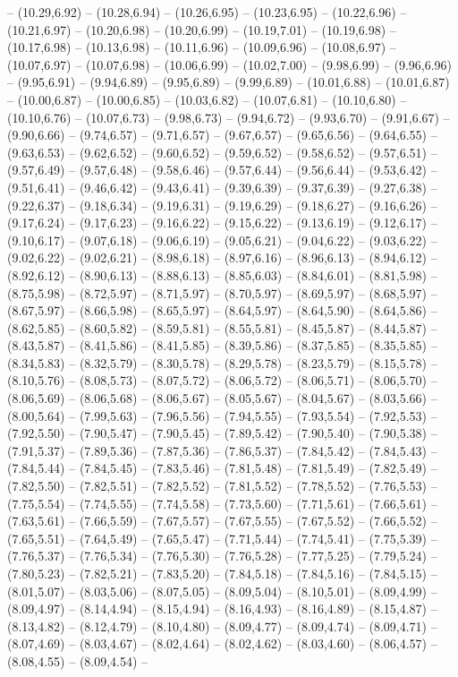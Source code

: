 {-- (10.29,6.92) -- (10.28,6.94) -- (10.26,6.95) -- (10.23,6.95) -- (10.22,6.96) -- (10.21,6.97) -- (10.20,6.98) -- (10.20,6.99) -- (10.19,7.01) -- (10.19,6.98) -- (10.17,6.98) -- (10.13,6.98) -- (10.11,6.96) -- (10.09,6.96) -- (10.08,6.97) -- (10.07,6.97) -- (10.07,6.98) -- (10.06,6.99) -- (10.02,7.00) -- (9.98,6.99) -- (9.96,6.96) -- (9.95,6.91) -- (9.94,6.89) -- (9.95,6.89) -- (9.99,6.89) -- (10.01,6.88) -- (10.01,6.87) -- (10.00,6.87) -- (10.00,6.85) -- (10.03,6.82) -- (10.07,6.81) -- (10.10,6.80) -- (10.10,6.76) -- (10.07,6.73) -- (9.98,6.73) -- (9.94,6.72) -- (9.93,6.70) -- (9.91,6.67) -- (9.90,6.66) -- (9.74,6.57) -- (9.71,6.57) -- (9.67,6.57) -- (9.65,6.56) -- (9.64,6.55) -- (9.63,6.53) -- (9.62,6.52) -- (9.60,6.52) -- (9.59,6.52) -- (9.58,6.52) -- (9.57,6.51) -- (9.57,6.49) -- (9.57,6.48) -- (9.58,6.46) -- (9.57,6.44) -- (9.56,6.44) -- (9.53,6.42) -- (9.51,6.41) -- (9.46,6.42) -- (9.43,6.41) -- (9.39,6.39) -- (9.37,6.39) -- (9.27,6.38) -- (9.22,6.37) -- (9.18,6.34) -- (9.19,6.31) -- (9.19,6.29) -- (9.18,6.27) -- (9.16,6.26) -- (9.17,6.24) -- (9.17,6.23) -- (9.16,6.22) -- (9.15,6.22) -- (9.13,6.19) -- (9.12,6.17) -- (9.10,6.17) -- (9.07,6.18) -- (9.06,6.19) -- (9.05,6.21) -- (9.04,6.22) -- (9.03,6.22) -- (9.02,6.22) -- (9.02,6.21) -- (8.98,6.18) -- (8.97,6.16) -- (8.96,6.13) -- (8.94,6.12) -- (8.92,6.12) -- (8.90,6.13) -- (8.88,6.13) -- (8.85,6.03) -- (8.84,6.01) -- (8.81,5.98) -- (8.75,5.98) -- (8.72,5.97) -- (8.71,5.97) -- (8.70,5.97) -- (8.69,5.97) -- (8.68,5.97) -- (8.67,5.97) -- (8.66,5.98) -- (8.65,5.97) -- (8.64,5.97) -- (8.64,5.90) -- (8.64,5.86) -- (8.62,5.85) -- (8.60,5.82) -- (8.59,5.81) -- (8.55,5.81) -- (8.45,5.87) -- (8.44,5.87) -- (8.43,5.87) -- (8.41,5.86) -- (8.41,5.85) -- (8.39,5.86) -- (8.37,5.85) -- (8.35,5.85) -- (8.34,5.83) -- (8.32,5.79) -- (8.30,5.78) -- (8.29,5.78) -- (8.23,5.79) -- (8.15,5.78) -- (8.10,5.76) -- (8.08,5.73) -- (8.07,5.72) -- (8.06,5.72) -- (8.06,5.71) -- (8.06,5.70) -- (8.06,5.69) -- (8.06,5.68) -- (8.06,5.67) -- (8.05,5.67) -- (8.04,5.67) -- (8.03,5.66) -- (8.00,5.64) -- (7.99,5.63) -- (7.96,5.56) -- (7.94,5.55) -- (7.93,5.54) -- (7.92,5.53) -- (7.92,5.50) -- (7.90,5.47) -- (7.90,5.45) -- (7.89,5.42) -- (7.90,5.40) -- (7.90,5.38) -- (7.91,5.37) -- (7.89,5.36) -- (7.87,5.36) -- (7.86,5.37) -- (7.84,5.42) -- (7.84,5.43) -- (7.84,5.44) -- (7.84,5.45) -- (7.83,5.46) -- (7.81,5.48) -- (7.81,5.49) -- (7.82,5.49) -- (7.82,5.50) -- (7.82,5.51) -- (7.82,5.52) -- (7.81,5.52) -- (7.78,5.52) -- (7.76,5.53) -- (7.75,5.54) -- (7.74,5.55) -- (7.74,5.58) -- (7.73,5.60) -- (7.71,5.61) -- (7.66,5.61) -- (7.63,5.61) -- (7.66,5.59) -- (7.67,5.57) -- (7.67,5.55) -- (7.67,5.52) -- (7.66,5.52) -- (7.65,5.51) -- (7.64,5.49) -- (7.65,5.47) -- (7.71,5.44) -- (7.74,5.41) -- (7.75,5.39) -- (7.76,5.37) -- (7.76,5.34) -- (7.76,5.30) -- (7.76,5.28) -- (7.77,5.25) -- (7.79,5.24) -- (7.80,5.23) -- (7.82,5.21) -- (7.83,5.20) -- (7.84,5.18) -- (7.84,5.16) -- (7.84,5.15) -- (8.01,5.07) -- (8.03,5.06) -- (8.07,5.05) -- (8.09,5.04) -- (8.10,5.01) -- (8.09,4.99) -- (8.09,4.97) -- (8.14,4.94) -- (8.15,4.94) -- (8.16,4.93) -- (8.16,4.89) -- (8.15,4.87) -- (8.13,4.82) -- (8.12,4.79) -- (8.10,4.80) -- (8.09,4.77) -- (8.09,4.74) -- (8.09,4.71) -- (8.07,4.69) -- (8.03,4.67) -- (8.02,4.64) -- (8.02,4.62) -- (8.03,4.60) -- (8.06,4.57) -- (8.08,4.55) -- (8.09,4.54) -- }
